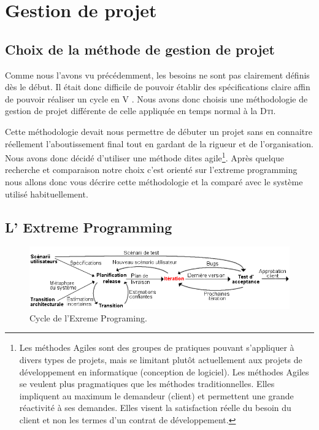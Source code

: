 \section{Gestion de projet}
    \subsection{Choix de la méthode de gestion de projet}
Comme nous l'avons vu précédemment, les besoins ne sont pas clairement définis dès le début. Il était donc difficile de pouvoir établir des spécifications claire affin de pouvoir réaliser un cycle en V . Nous avons donc choisis une méthodologie de gestion de projet différente de celle appliquée en temps normal à la \textsc{Dti}.

Cette méthodologie devait nous permettre de débuter un projet sans en connaitre réellement l'aboutissement final tout en gardant de la rigueur et de l'organisation. Nous avons donc décidé d'utiliser une méthode dites agile\footnote{Les méthodes Agiles sont des groupes de pratiques pouvant s'appliquer à divers types de projets, mais se limitant plutôt actuellement aux projets de développement en informatique (conception de logiciel). Les méthodes Agiles se veulent plus pragmatiques que les méthodes traditionnelles. Elles impliquent au maximum le demandeur (client) et permettent une grande réactivité à ses demandes. Elles visent la satisfaction réelle du besoin du client et non les termes d'un contrat de développement. }. Après quelque recherche et comparaison notre choix c'est orienté sur l'extreme programming  nous allons donc vous décrire cette méthodologie et la comparé avec le système utilisé habituellement.

    \subsection{L' Extreme Programming\label{extreme}}

\begin{figure}[!h]
\center
\includegraphics[width=15cm]{images/xp.png}
\caption{Cycle de l'Exreme Programing.}
\label{XP}
\end{figure}

